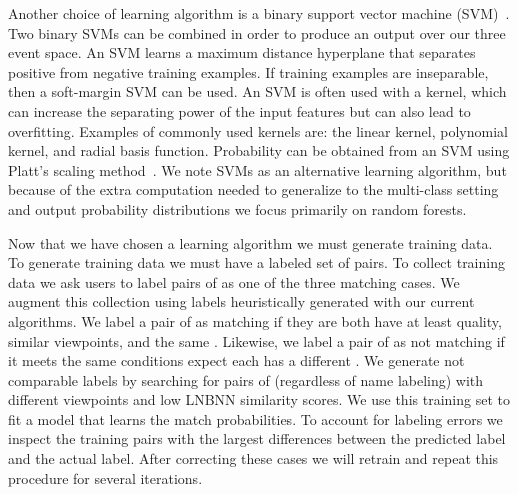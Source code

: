             Another choice of learning algorithm is a binary support vector
              machine (SVM)~\cite{vapnik_statistical_1998}.
            Two binary SVMs can be combined in order to produce an output over
              our three event space.
            An SVM learns a maximum distance hyperplane that separates
              positive from negative training examples.
            If training examples are inseparable, then a soft-margin SVM can
              be used.
            An SVM is often used with a kernel, which can increase the
              separating power of the input features but can also lead to
              overfitting.
            Examples of commonly used kernels are:
            the linear kernel, polynomial kernel, and radial basis function.
            Probability can be obtained from an SVM using Platt's scaling
              method~\cite{platt_probabilistic_1999}.
            We note SVMs as an alternative learning algorithm, but because of
              the extra computation needed to generalize to the multi-class
              setting and output probability distributions we focus primarily on
              random forests.

            Now that we have chosen a learning algorithm we must generate
              training data.
            To generate training data we must have a labeled set of \annot{}
              pairs.
            To collect training data we ask users to label pairs of \annots{}
              as one of the three matching cases.
            We augment this collection using labels heuristically generated
              with our current algorithms.
            We label a pair of \annots{} as matching if they are both have at
              least \qualGood{} quality, similar viewpoints, and the same
              \name{}.
            Likewise, we label a pair of \annots{} as not matching if it meets
              the same conditions expect each \annot{} has a different \name{}.
            We generate not comparable labels by searching for pairs of
              \annots{} (regardless of name labeling) with different viewpoints
              and low LNBNN similarity scores.
            We use this training set to fit a model that learns the match
              probabilities.
            To account for labeling errors we inspect the training pairs with
              the largest differences between the predicted label and the actual
              label.
            After correcting these cases we will retrain and repeat this
              procedure for several iterations.

